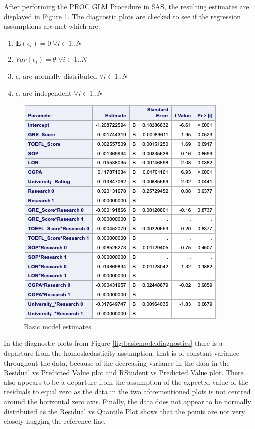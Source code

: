 \documentclass{article}
\begin{document}
After performing the PROC GLM Procedure in SAS, the resulting estimates are displayed in Figure \ref{fig:basicmodelestimate}. The diagnostic plots are checked to see if the regression assumptions are met which are:

\begin{enumerate}

\item $\mathbf{E}(\epsilon_i) = 0$ $ \forall i \in {1..N}$
\item $Var(\epsilon_i) = \theta$ $\forall i \in {1..N}$
\item $\epsilon_i$ are normally distributed $\forall i \in {1..N}$
\item $\epsilon_i$ are independent $\forall i \in {1..N}$

\end{enumerate}


\begin{figure}
\centering
\includegraphics[scale=0.8]{basic_model_estimates.png}
\caption{Basic model estimates}
\label{fig:basicmodelestimate}
\end{figure}

In the diagnostic plots from Figure \ref{fig:basicmodeldiagnostics} there is a departure from the homoskedasticity assumption, that is of constant variance throughout the data, because of the decreasing variance in the data in the Residual vs Predicted Value plot and RStudent vs Predicted Value plot. There also appears to be a departure from the assumption of the expected value of the residuals to equal zero as the data in the two aforementioned plots is not centred around the horizontal zero axis. Finally, the data does not appear to be normally distributed as the Residual vs Quantile Plot shows that the points are not very closely hugging the reference line.
\end{document}
